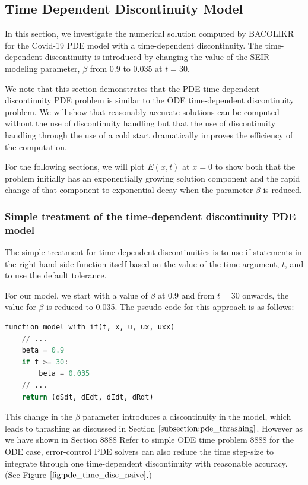 \documentclass{article}
\begin{document}
\subsection{Time Dependent Discontinuity Model}
\label{subsection:pde_time_intro}
In this section, we investigate the numerical solution computed by BACOLIKR for the Covid-19 PDE model with a time-dependent discontinuity. The time-dependent discontinuity is introduced by changing the value of the SEIR modeling parameter, $\beta$ from 0.9 to 0.035 at $t=30$.

We note that this section demonstrates that the PDE time-dependent discontinuity PDE problem is similar to the ODE time-dependent discontinuity problem. We will show that reasonably accurate solutions can be computed without the use of discontinuity handling but that the use of discontinuity handling through the use of a cold start dramatically improves the efficiency of the computation.

For the following sections, we will plot $E(x, t)$ at $x=0$ to show both that the problem initially has an exponentially growing solution component and the rapid change of that component to exponential decay when the parameter $\beta$ is reduced.

\subsubsection{Simple treatment of the time-dependent discontinuity PDE model}
\label{subsubsection:pde_time_naive}
The simple treatment for time-dependent discontinuities is to use if-statements in the right-hand side function itself based on the value of the time argument, $t$, and to use the default tolerance.

For our model, we start with a value of $\beta$ at 0.9 and from $t=30$ onwards, the value for $\beta$ is reduced to 0.035. The pseudo-code for this approach is as follows:

\begin{minipage}{\linewidth}
\begin{lstlisting}[language=Python]
function model_with_if(t, x, u, ux, uxx)
	// ...
	beta = 0.9
	if t >= 30:
		beta = 0.035
	// ...
	return (dSdt, dEdt, dIdt, dRdt)

\end{lstlisting}
\end{minipage}

This change in the $\beta$ parameter introduces a discontinuity in the model, which leads to thrashing as discussed in Section $\ref{subsection:pde_thrashing}$. However as we have shown in Section 8888 Refer to simple ODE time problem 8888 for the ODE case, error-control PDE solvers can also reduce the time step-size to integrate through one time-dependent discontinuity with reasonable accuracy. (See Figure $\ref{fig:pde_time_disc_naive}$.)
\end{document}
